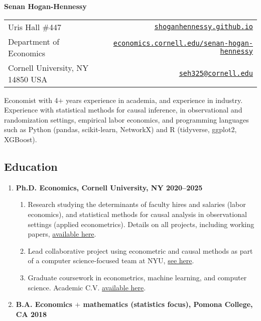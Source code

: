 \documentclass[letterpaper,11pt,oneside]{article}
\begin{document}
\centerline{\LARGE{\textbf{Senan Hogan-Hennessy}}}
\vspace{0.1cm}
\begin{table}[H]
    \centering
    \begin{tabular*}{\textwidth}{l @{\extracolsep{\fill}} r}
        \toprule
        Uris Hall \#447 &
            \href{https://shoganhennessy.github.io}{
                \nolinkurl{shoganhennessy.github.io}} \\
        Department of Economics &
            \href{https://economics.cornell.edu/senan-hogan-hennessy}{
                \nolinkurl{economics.cornell.edu/senan-hogan-hennessy}} \\
        Cornell University, NY 14850 USA &
            \href{mailto:seh325@cornell.edu}{\nolinkurl{seh325@cornell.edu}} \\
        \bottomrule
    \end{tabular*}
\end{table}

Economist with 4$+$ years experience in academia, and experience in industry.
Experience with statistical methods for causal inference, in observational and randomization settings, empirical labor economics, and programming languages such as Python (pandas, scikit-learn, NetworkX) and R (tidyverse, ggplot2, XGBoost). 

\subsection*{Education}
\begin{enumerate}[itemsep=2.5pt, label={}, leftmargin=0pt]
    \item \textbf{Ph.D. Economics, Cornell University, NY \hfill 2020--2025}%
    \begin{enumerate}[itemsep=0pt, label={\textbf{--}}, leftmargin=12pt]
        \item Research studying the determinants of faculty hires and salaries (labor economics), and statistical methods for causal analysis in observational settings (applied econometrics).
        Details on all projects, including working papers, \href{https://shoganhennessy.github.io/research/}{available here}.

        \item Lead collaborative project using econometric and causal methods as part of a computer science-focused team at NYU, \href{https://doi.org/10.48550/arXiv.2210.07970}{see here}.
        
        \item Graduate coursework in econometrics, machine learning, and computer science.
        Academic C.V. \href{https://shoganhennessy.github.io/files/cv/cv-shoganhennessy.pdf}{available here}.
\end{enumerate}
    
    \item \textbf{B.A. Economics $+$ mathematics (statistics focus), Pomona College, CA \hfill 2018}
\end{enumerate}
\end{document}
